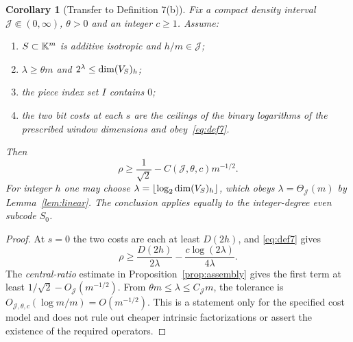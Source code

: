 \documentclass[10pt,a4paper]{article}
\numberwithin{equation}{section}
\newtheorem{corollary}[theorem]{Corollary}
\theoremstyle{remark}\newtheorem{remark}[theorem]{Remark}\newtheorem{question}[theorem]{Question}
\begin{document}
\begin{corollary}[Transfer to Definition 7(b)]\label{cor:def7}
Fix a compact density interval $\mathcal J\Subset(0,\infty)$, $\theta>0$ and an integer $c\ge1$. Assume:
\begin{enumerate}[label=\textup{(\roman*)}]
\item $S\subset\mathbb K^m$ is additive isotropic and $h/m\in \mathcal J$;
\item $\lambda\ge\theta m$ and $2^\lambda\le\operatorname{dim}(V_S)_h$;
\item the piece index set $I$ contains $0$;
\item the two bit costs at each $s$ are the \emph{ceilings} of the binary logarithms of the prescribed window dimensions and obey~\eqref{eq:def7}.
\end{enumerate}
Then
\begin{equation}\label{eq:transfer}
\rho\ge\frac1{\sqrt2}-C(\mathcal J,\theta,c)m^{-1/2}.
\end{equation}
For integer $h$ one may choose $\lambda=\lfloor\log_2\operatorname{dim}(V_S)_h\rfloor$, which obeys $\lambda=\Theta_{\mathcal J}(m)$ by Lemma~\ref{lem:linear}. The conclusion applies equally to the integer-degree even subcode $S_0$.
\end{corollary}
\begin{proof}At $s=0$ the two costs are each at least $D(2h)$, and \eqref{eq:def7} gives
\[
\rho\ge\frac{D(2h)}{2\lambda}-\frac{c\log(2\lambda)}{4\lambda}.
\]
The \emph{central-ratio} estimate in Proposition~\ref{prop:assembly} gives the first term at least $1/\sqrt2-O_{\mathcal J}(m^{-1/2})$. From $\theta m\le\lambda\le C_{\mathcal J}m$, the tolerance is $O_{\mathcal J,\theta,c}(\log m/m)=O(m^{-1/2})$. This is a statement only for the specified cost model and does not rule out cheaper intrinsic factorizations or assert the existence of the required operators.\end{proof}
\end{document}
